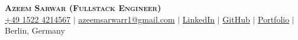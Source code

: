 

\begin{center}
    \textbf{\Huge \scshape Azeem Sarwar \small (Fullstack Engineer)} \\ \vspace{3pt}
    \small
    \faMobile \hspace{.5pt} \href{tel:004915224214567}{+49 1522 4214567}
    $|$
    \faAt \hspace{.5pt} \href{mailto:azeemsarwarr1@gmail.com}{azeemsarwarr1@gmail.com}
    $|$
    \faLinkedinSquare \hspace{.5pt} \href{https://www.linkedin.com/in/azeemsarwarr}{LinkedIn}
    $|$
    \faGithub \hspace{.5pt} \href{https://github.com/arasgungore}{GitHub}
    $|$
    \faGlobe \hspace{.5pt} \href{https://azeemsarwar.de}{Portfolio}
    $|$
    \faMapMarker \hspace{.5pt} {Berlin, Germany}
\end{center}